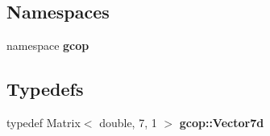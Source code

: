 \subsection*{\-Namespaces}
\begin{DoxyCompactItemize}
\item 
namespace {\bf gcop}
\end{DoxyCompactItemize}
\subsection*{\-Typedefs}
\begin{DoxyCompactItemize}
\item 
typedef \-Matrix$<$ double, 7, 1 $>$ {\bf gcop\-::\-Vector7d}
\end{DoxyCompactItemize}

